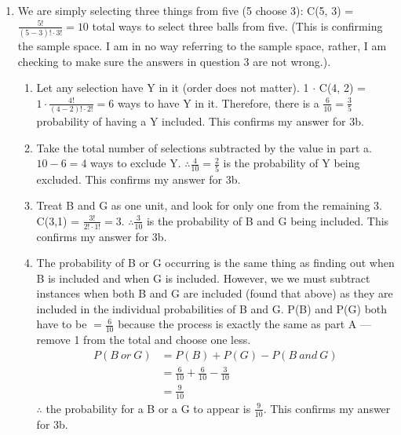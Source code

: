 \documentclass[11pt]{article}
\begin{document}
\begin{flushleft}
\begin{enumerate}
				      					      	\item {
				      					      		      We are simply selecting three things from five (5 choose 3): C(5, 3) = $\frac{5!}{(5-3)!\cdot 3!} = 10$ total ways to select three balls from five. (This is confirming the sample space. I am in no way referring to the sample space, rather, I am checking to make sure the answers in question 3 are not wrong.).
				      					      		      \begin{enumerate}
				      					      		      	\item {
				      					      		      		      Let any selection have Y in it (order does not matter). 1 $\cdot$ C(4, 2) = $1 \cdot \frac{4!}{(4-2)!\cdot 2!} = 6$ ways to have Y in it. Therefore, there is a $\frac{6}{10} = \frac{3}{5}$ probability of having a Y included. This confirms my answer for 3b.
				      					      		      		}
				      					      		      		\item {
				      					      		      			      Take the total number of selections subtracted by the value in part a. $10 - 6 = 4$ ways to exclude Y. $\therefore \frac{4}{10} = \frac{2}{5}$ is the probability of Y being excluded. This confirms my answer for 3b.
				      					      		      			}
				      					      		      			\item {
				      					      		      				      Treat B and G as one unit, and look for only one from the remaining 3. C(3,1) = $\frac{3!}{2!\cdot 1!} = 3$. $\therefore \frac{3}{10}$ is the probability of B and G being included. This confirms my answer for 3b.
				      					      		      				}
				      					      		      				\item {
				      					      		      					      The probability of B or G occurring is the same thing as finding out when B is included and when G is included. However, we we must subtract instances when both B and G are included (found that above) as they are included in the individual probabilities of B and G. P(B) and P(G) both have to be $=\frac{6}{10}$ because the process is exactly the same as part A --- remove 1 from the total and choose one less.
				      					      		      					      \begin{align*}
				      					      		      					      	P(B\ or\ G) & = P(B) + P(G) - P(B\ and\ G)                  \\
				      					      		      					      	            & = \frac{6}{10} + \frac{6}{10}  - \frac{3}{10} \\
				      					      		      					      	            & = \frac{9}{10}                                
				      					      		      					      \end{align*}
				      					      		      					      $\therefore$ the probability for a B or a G to appear is $\frac{9}{10}$. This confirms my answer for 3b.
				      					      		      					}
				      					      		      				\end{enumerate}
				      					      		      			}
				      					      		      			

\end{enumerate}
\end{flushleft}
\end{document}
